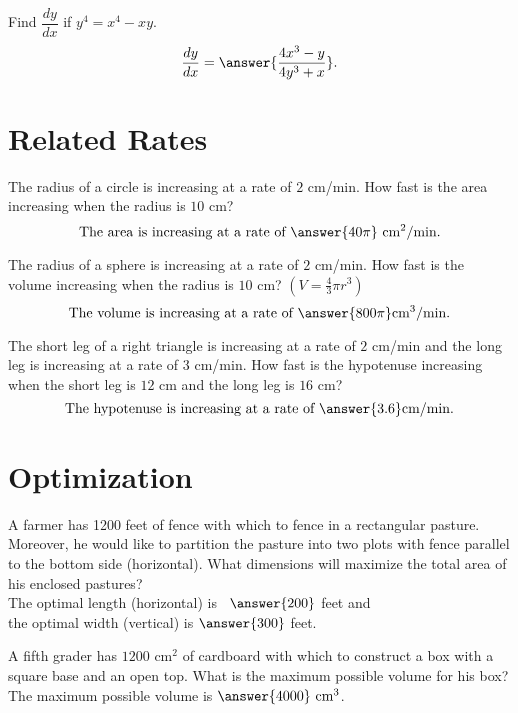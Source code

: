 \documentclass{ximera}
\begin{document}
\begin{problem}
Find $\dfrac{dy}{dx}$ if $ y^4 = x^4 - xy$.
\[\frac{dy}{dx} = \answer{\frac{4x^3 - y}{4y^3 +x}}.\]
\end{problem}

\section{Related Rates}
\begin{problem}
The radius of a circle is increasing at a rate of $2$ cm/min. 
How fast is the area increasing when the radius is $10$ cm?
\[\text{The area is increasing at a rate of} \ \answer{40\pi} \ \text{cm$^2$/min}.\]
\end{problem}

\begin{problem}
The radius of a sphere is increasing at a rate of $2$ cm/min. 
How fast is the volume increasing when the radius is $10$ cm? $(V= \frac43 \pi r^3)$
\[\text{The volume is increasing at a rate of} \ \answer{800\pi}  \text{cm$^3$/min}.\]
\end{problem}


\begin{problem}
The short leg of a right triangle is increasing at a rate of $2$ cm/min and 
the long leg is increasing at a rate of $3$ cm/min.
How fast is the hypotenuse increasing when the short 
leg is $12$ cm and the long leg is $16$ cm?
\[\text{The hypotenuse is increasing at a rate of} \ \answer{3.6} \text{cm/min}.\]
\end{problem}



\section{Optimization}

\begin{problem}
A farmer has 1200 feet of fence with which to fence in a rectangular pasture.  Moreover, he would like to partition the pasture into two plots with fence parallel to the bottom side (horizontal). What dimensions will maximize the total area of his enclosed pastures?\\
The optimal length (horizontal) is \ $\answer{200}$ feet and\\
the optimal width (vertical) is $\answer{300}$ feet.
\end{problem}

\begin{problem}
A fifth grader has $1200$ cm$^2$ of cardboard with which to construct a box with a square base and an open top. What is the maximum possible volume for his box?\\
The maximum possible volume is $\answer{4000} \  \text{cm}^3$.
\end{problem}
\end{document}
